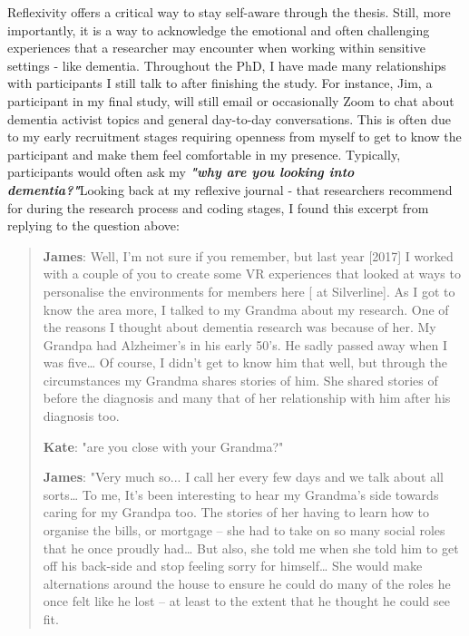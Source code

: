 Reflexivity offers a critical way to stay self-aware through the thesis. Still, more importantly, it is a way to acknowledge the emotional and often challenging experiences that a researcher may encounter when working within sensitive settings - like dementia. Throughout the PhD, I have made many relationships with participants I still talk to after finishing the study. For instance, Jim, a participant in my final study, will still email or occasionally Zoom to chat about dementia activist topics and general day-to-day conversations. This is often due to my early recruitment stages requiring openness from myself to get to know the participant and make them feel comfortable in my presence. Typically, participants would often ask my \textit{\textbf{"why are you looking into dementia?"}}Looking back at my reflexive journal - that researchers recommend for during the research process and coding stages, I found this excerpt from  replying to the question above:

\begin{quote}
    
\textbf{James}: Well, I'm not sure if you remember, but last year [2017] I worked with a couple of you to create some VR experiences that looked at ways to personalise the environments for members here [ at Silverline]. As I got to know the area more, I talked to my Grandma about my research. One of the reasons I thought about dementia research was because of her. My Grandpa had Alzheimer's in his early 50's. He sadly passed away when I was five… Of course, I didn't get to know him that well, but through the circumstances my Grandma shares stories of him. She shared stories of before the diagnosis and many that of her relationship with him after his diagnosis too.

\textbf{Kate}: "are you close with your Grandma?"

\textbf{James}: "Very much so... I call her every few days and we talk about all sorts… To me, It's been interesting to hear my Grandma's side towards caring for my Grandpa too. The stories of her having to learn how to organise the bills, or mortgage – she had to take on so many social roles that he once proudly had… But also, she told me when she told him to get off his back-side and stop feeling sorry for himself… She would make alternations around the house to ensure he could do many of the roles he once felt like he lost – at least to the extent that he thought he could see fit. 
\end{quote}

